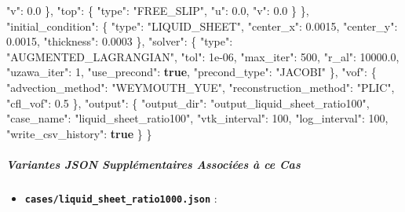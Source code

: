 \documentclass[
  10pt,
]{article}
\newenvironment{Shaded}{}{}
\newcommand{\DataTypeTok}[1]{\textcolor[rgb]{0.56,0.13,0.00}{#1}}
\newcommand{\DecValTok}[1]{\textcolor[rgb]{0.25,0.63,0.44}{#1}}
\newcommand{\FloatTok}[1]{\textcolor[rgb]{0.25,0.63,0.44}{#1}}
\newcommand{\FunctionTok}[1]{\textcolor[rgb]{0.02,0.16,0.49}{#1}}
\newcommand{\KeywordTok}[1]{\textcolor[rgb]{0.00,0.44,0.13}{\textbf{#1}}}
\newcommand{\StringTok}[1]{\textcolor[rgb]{0.25,0.44,0.63}{#1}}
\providecommand{\tightlist}{%
  \setlength{\itemsep}{0pt}\setlength{\parskip}{0pt}}
\begin{document}
\begin{Shaded}
\begin{Highlighting}[]
      \DataTypeTok{"v"}\FunctionTok{:} \FloatTok{0.0}
    \FunctionTok{\},}
    \DataTypeTok{"top"}\FunctionTok{:} \FunctionTok{\{}
      \DataTypeTok{"type"}\FunctionTok{:} \StringTok{"FREE\_SLIP"}\FunctionTok{,}
      \DataTypeTok{"u"}\FunctionTok{:} \FloatTok{0.0}\FunctionTok{,}
      \DataTypeTok{"v"}\FunctionTok{:} \FloatTok{0.0}
    \FunctionTok{\}}
  \FunctionTok{\},}
  \DataTypeTok{"initial\_condition"}\FunctionTok{:} \FunctionTok{\{}
    \DataTypeTok{"type"}\FunctionTok{:} \StringTok{"LIQUID\_SHEET"}\FunctionTok{,}
    \DataTypeTok{"center\_x"}\FunctionTok{:} \FloatTok{0.0015}\FunctionTok{,}
    \DataTypeTok{"center\_y"}\FunctionTok{:} \FloatTok{0.0015}\FunctionTok{,}
    \DataTypeTok{"thickness"}\FunctionTok{:} \FloatTok{0.0003}
  \FunctionTok{\},}
  \DataTypeTok{"solver"}\FunctionTok{:} \FunctionTok{\{}
    \DataTypeTok{"type"}\FunctionTok{:} \StringTok{"AUGMENTED\_LAGRANGIAN"}\FunctionTok{,}
    \DataTypeTok{"tol"}\FunctionTok{:} \DecValTok{1e{-}06}\FunctionTok{,}
    \DataTypeTok{"max\_iter"}\FunctionTok{:} \DecValTok{500}\FunctionTok{,}
    \DataTypeTok{"r\_al"}\FunctionTok{:} \FloatTok{10000.0}\FunctionTok{,}
    \DataTypeTok{"uzawa\_iter"}\FunctionTok{:} \DecValTok{1}\FunctionTok{,}
    \DataTypeTok{"use\_precond"}\FunctionTok{:} \KeywordTok{true}\FunctionTok{,}
    \DataTypeTok{"precond\_type"}\FunctionTok{:} \StringTok{"JACOBI"}
  \FunctionTok{\},}
  \DataTypeTok{"vof"}\FunctionTok{:} \FunctionTok{\{}
    \DataTypeTok{"advection\_method"}\FunctionTok{:} \StringTok{"WEYMOUTH\_YUE"}\FunctionTok{,}
    \DataTypeTok{"reconstruction\_method"}\FunctionTok{:} \StringTok{"PLIC"}\FunctionTok{,}
    \DataTypeTok{"cfl\_vof"}\FunctionTok{:} \FloatTok{0.5}
  \FunctionTok{\},}
  \DataTypeTok{"output"}\FunctionTok{:} \FunctionTok{\{}
    \DataTypeTok{"output\_dir"}\FunctionTok{:} \StringTok{"output\_liquid\_sheet\_ratio100"}\FunctionTok{,}
    \DataTypeTok{"case\_name"}\FunctionTok{:} \StringTok{"liquid\_sheet\_ratio100"}\FunctionTok{,}
    \DataTypeTok{"vtk\_interval"}\FunctionTok{:} \DecValTok{100}\FunctionTok{,}
    \DataTypeTok{"log\_interval"}\FunctionTok{:} \DecValTok{100}\FunctionTok{,}
    \DataTypeTok{"write\_csv\_history"}\FunctionTok{:} \KeywordTok{true}
  \FunctionTok{\}}
\FunctionTok{\}}
\end{Highlighting}
\end{Shaded}

\subparagraph{Variantes JSON Supplémentaires Associées à ce
Cas}\label{variantes-json-suppluxe9mentaires-associuxe9es-uxe0-ce-cas-3}

\begin{itemize}
\tightlist
\item
  \textbf{\texttt{cases/liquid\_sheet\_ratio1000.json}} :
\end{itemize}
\end{document}
